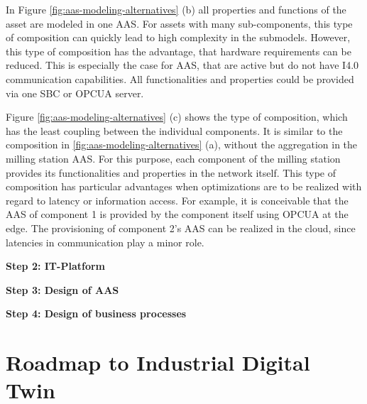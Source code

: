 In Figure \ref{fig:aas-modeling-alternatives} (b) all properties and functions of the asset are modeled in one \ac{AAS}. For assets with many sub-components, this type of composition can quickly lead to high complexity in the submodels. However, this type of composition has the advantage, that hardware requirements can be reduced. This is especially the case for \ac{AAS}, that are active but do not have \ac{I4.0} communication capabilities. All functionalities and properties could be provided via one \ac{SBC} or \ac{OPCUA} server.

Figure \ref{fig:aas-modeling-alternatives} (c) shows the type of composition, which has the least coupling between the individual components. It is similar to the composition in \ref{fig:aas-modeling-alternatives} (a), without the aggregation in the milling station \ac{AAS}. For this purpose, each component of the milling station provides its functionalities and properties in the network itself. This type of composition has particular advantages when optimizations are to be realized with regard to latency or information access. For example, it is conceivable that the \ac{AAS} of component 1 is provided by the component itself using \ac{OPCUA} at the edge. The provisioning of component 2's \ac{AAS} can be realized in the cloud, since latencies in communication play a minor role.

\textbf{Step 2: IT-Platform}

\textbf{Step 3: Design of \ac{AAS}}

\textbf{Step 4: Design of business processes}


\section{Roadmap to Industrial Digital Twin}

